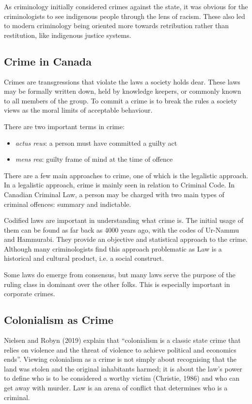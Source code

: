 \documentclass{article}
\begin{document}
As criminology initially considered crimes against the state, it was obvious for the criminologists to see indigenous people through the lens of racism. These also led to modern criminology being oriented more towards retribution rather than restitution, like indigenous justice systems.

\subsection{Crime in Canada}

Crimes are transgressions that violate the laws a society holds dear. These laws may be formally written down, held by knowledge keepers, or commonly known to all members of the group. To commit a crime is to break the rules a society views as the moral limits of acceptable behaviour.

There are two important terms in crime:

\begin{itemize}
    \item 	\textit{actus reus}: a person must have committed a guilty act
    \item 	\textit{mens rea}: guilty frame of mind at the time of offence
\end{itemize}

There are a few main approaches to crime, one of which is the legalistic approach. In a legalistic approach, crime is mainly seen in relation to Criminal Code. In Canadian Criminal Law, a person may be charged with two main types of criminal offences: summary and indictable.

Codified laws are important in understanding what crime is. The initial usage of them can  be found as far back as 4000 years ago, with the codes of Ur-Nammu and Hammurabi. They provide an objective and statistical approach to the crime. Although many criminologists find this approach problematic as Law is a historical and cultural product, i.e. a social construct.

Some laws do emerge from consensus, but many laws serve the purpose of the ruling class in dominant over the other folks. This is especially important in corporate crimes.

\subsection{Colonialism as Crime}
Nielsen and Robyn (2019) explain that “colonialism is a classic state crime that relies on violence and the threat of violence to achieve political and economics ends”. Viewing colonialism as a crime is not simply about recognising that the land was stolen and the original inhabitants harmed; it is about the law’s power to define who is to be considered a worthy victim (Christie, 1986) and who can get away with murder. Law is an arena of conflict that determines who is a criminal.
\end{document}
